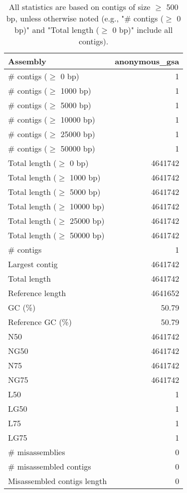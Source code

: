 \documentclass[12pt,a4paper]{article}
\begin{document}
\begin{table}[ht]
\begin{center}
\caption{All statistics are based on contigs of size $\geq$ 500 bp, unless otherwise noted (e.g., "\# contigs ($\geq$ 0 bp)" and "Total length ($\geq$ 0 bp)" include all contigs).}
\begin{tabular}{|l*{1}{|r}|}
\hline
Assembly & anonymous\_gsa \\ \hline
\# contigs ($\geq$ 0 bp) & 1 \\ \hline
\# contigs ($\geq$ 1000 bp) & 1 \\ \hline
\# contigs ($\geq$ 5000 bp) & 1 \\ \hline
\# contigs ($\geq$ 10000 bp) & 1 \\ \hline
\# contigs ($\geq$ 25000 bp) & 1 \\ \hline
\# contigs ($\geq$ 50000 bp) & 1 \\ \hline
Total length ($\geq$ 0 bp) & 4641742 \\ \hline
Total length ($\geq$ 1000 bp) & 4641742 \\ \hline
Total length ($\geq$ 5000 bp) & 4641742 \\ \hline
Total length ($\geq$ 10000 bp) & 4641742 \\ \hline
Total length ($\geq$ 25000 bp) & 4641742 \\ \hline
Total length ($\geq$ 50000 bp) & 4641742 \\ \hline
\# contigs & 1 \\ \hline
Largest contig & 4641742 \\ \hline
Total length & 4641742 \\ \hline
Reference length & 4641652 \\ \hline
GC (\%) & 50.79 \\ \hline
Reference GC (\%) & 50.79 \\ \hline
N50 & 4641742 \\ \hline
NG50 & 4641742 \\ \hline
N75 & 4641742 \\ \hline
NG75 & 4641742 \\ \hline
L50 & 1 \\ \hline
LG50 & 1 \\ \hline
L75 & 1 \\ \hline
LG75 & 1 \\ \hline
\# misassemblies & 0 \\ \hline
\# misassembled contigs & 0 \\ \hline
Misassembled contigs length & 0 \\ \hline

\end{tabular}
\end{center}
\end{table}
\end{document}
